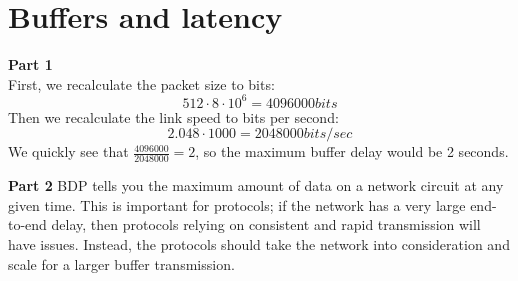 \section{Buffers and latency}
\textbf{Part 1}\\
First, we recalculate the packet size to bits:
\[
512 \cdot 8 \cdot 10^6 = 4096000 bits
\]
Then we recalculate the link speed to bits per second:
\[
2.048 \cdot 1000 = 2048000 bits/sec
\]
We quickly see that $\frac{4096000}{2048000} = 2$, so the maximum buffer delay
would be 2 seconds.

\noindent \textbf{Part 2}
BDP tells you the maximum amount of data on a network circuit at any given time. This is important
for protocols; if the network has a very large end-to-end delay, then protocols relying on consistent
and rapid transmission will have issues. Instead, the protocols should take the network into consideration
and scale for a larger buffer transmission.
